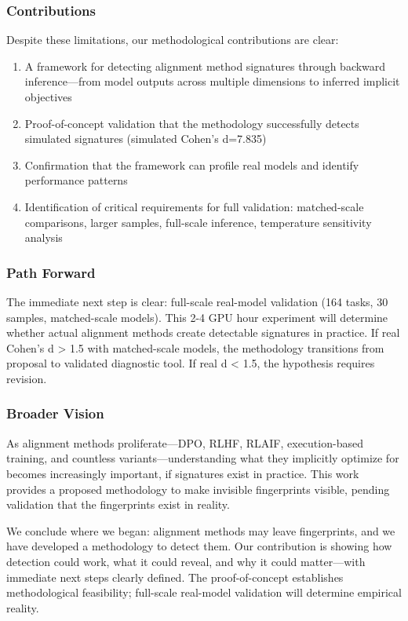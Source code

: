 \subsubsection{Contributions}

Despite these limitations, our methodological contributions are clear:

\begin{enumerate}
\item A framework for detecting alignment method signatures through backward inference---from model outputs across multiple dimensions to inferred implicit objectives
\item Proof-of-concept validation that the methodology successfully detects simulated signatures (simulated Cohen's d=7.835)
\item Confirmation that the framework can profile real models and identify performance patterns
\item Identification of critical requirements for full validation: matched-scale comparisons, larger samples, full-scale inference, temperature sensitivity analysis
\end{enumerate}

\subsubsection{Path Forward}

The immediate next step is clear: full-scale real-model validation (164 tasks, 30 samples, matched-scale models). This 2-4 GPU hour experiment will determine whether actual alignment methods create detectable signatures in practice. If real Cohen's d > 1.5 with matched-scale models, the methodology transitions from proposal to validated diagnostic tool. If real d < 1.5, the hypothesis requires revision.

\subsubsection{Broader Vision}

As alignment methods proliferate---DPO, RLHF, RLAIF, execution-based training, and countless variants---understanding what they implicitly optimize for becomes increasingly important, if signatures exist in practice. This work provides a proposed methodology to make invisible fingerprints visible, pending validation that the fingerprints exist in reality.

We conclude where we began: alignment methods may leave fingerprints, and we have developed a methodology to detect them. Our contribution is showing how detection could work, what it could reveal, and why it could matter---with immediate next steps clearly defined. The proof-of-concept establishes methodological feasibility; full-scale real-model validation will determine empirical reality.
